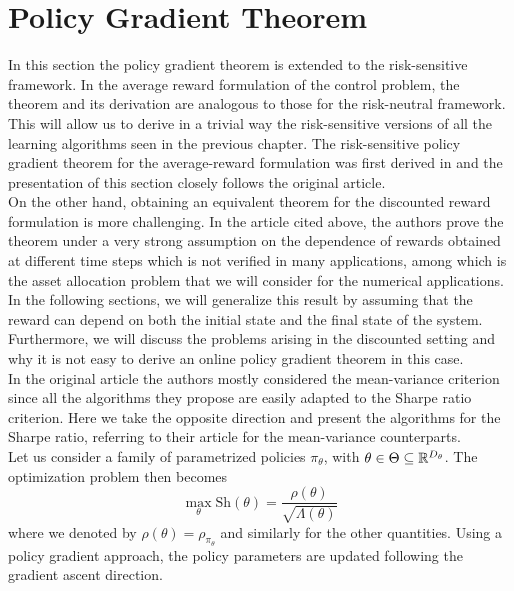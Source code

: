 \section{Policy Gradient Theorem}
In this section the policy gradient theorem is extended to the risk-sensitive framework. In the average reward formulation of the control problem, the theorem and its derivation are analogous to those for the risk-neutral framework. This will allow us to derive in a trivial way the risk-sensitive versions of all the learning algorithms seen in the previous chapter. The risk-sensitive policy gradient theorem for the average-reward formulation was first derived in \cite{prashanth2014actor} and the presentation of this section closely follows the original article.\\
On the other hand, obtaining an equivalent theorem for the discounted reward formulation is more challenging. In the article cited above, the authors prove the theorem under a very strong assumption on the dependence of rewards obtained at different time steps which is not verified in many applications, among which is the asset allocation problem that we will consider for the numerical applications. In the following sections, we will generalize this result by assuming that the reward can depend on both the initial state and the final state of the system. Furthermore, we will discuss the problems arising in the discounted setting and why it is not easy to derive an online policy gradient theorem in this case.\\
 In the original article the authors mostly considered the mean-variance criterion since all the algorithms they propose are easily adapted to the Sharpe ratio criterion. Here we take the opposite direction and present the algorithms for the Sharpe ratio, referring to their article for the mean-variance counterparts.\\   
Let us consider a family of parametrized policies $\pi_\theta$, with $\theta
\in \Theta \subseteq \mathbb{R}^{D_\theta}$. The optimization problem then becomes
\begin{equation}
	\max_\theta \text{Sh}(\theta) = \frac{\rho(\theta)}{\sqrt{\Lambda(\theta)}}
\end{equation}
where we denoted by $\rho(\theta) = \rho_{\pi_\theta}$ and similarly for the other quantities. Using a policy gradient approach, the policy parameters are updated following the gradient ascent direction.

